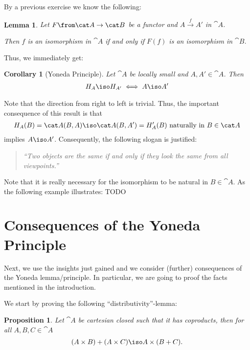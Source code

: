 \documentclass{article}
\newtheorem{lemma}{Lemma}
\newtheorem{proposition}{Proposition}
\newtheorem{corollary}{Corollary}
\begin{document}
By a previous exercise we know the following:
\begin{lemma}
  Let $F\from\cat A\to\cat B$ be a functor and $A\xrightarrow{f} A'$ in $\cat A$.

  Then $f$ is an isomorphism in $\cat A$ if and only if $F(f)$ is an isomorphism in $\cat B$.
\end{lemma}
Thus, we immediately get:
\begin{corollary}[Yoneda Principle]
  Let $\cat A$ be locally small and $A,A'\in\cat A$. Then
  \begin{align*}
    H_A\iso H_{A'} \iff A\iso A'
  \end{align*}
\end{corollary}
Note that the direction from right to left is trivial. Thus, the important consequence of this result is that
\begin{align*}
  H_A(B)=\cat A(B,A)\iso \cat  A(B,A')=H_A'(B) \text{ naturally in } B\in\cat A
\end{align*}
implies $A\iso A'$. Consequently, the following slogan is justified:
\begin{quote}
  \textit{``Two objects are the same if and only if they look the same from all viewpoints.''}
\end{quote}
Note that it is really necessary for the isomorphism to be natural in $B\in\cat A$. As the following example illustrates:
TODO
\section{Consequences of the Yoneda Principle}
Next, we use the insights just gained and we consider (further) consequences of the Yoneda lemma/principle. In particular, we are going to proof the facts mentioned in the introduction.

We start by proving the following ``distributivity''-lemma:

\begin{proposition}
  \label{prop:dis}
  Let $\cat A$ be cartesian closed such that it has coproducts, then for all $A,B,C\in\cat A$
  \begin{align*}
    (A\times B)+(A\times C)\iso A\times (B+C).
  \end{align*}
\end{proposition}
\end{document}
